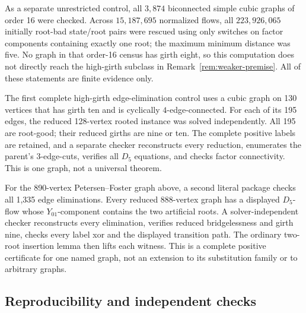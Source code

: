 \documentclass[11pt]{article}
\theoremstyle{definition}
\theoremstyle{remark}
\begin{document}
As a separate unrestricted control, all \(3{,}874\) biconnected simple
cubic graphs of order 16 were checked.  Across \(15{,}187{,}695\)
normalized flows, all \(223{,}926{,}065\) initially root-bad state/root
pairs were rescued using only switches on factor components containing
exactly one root; the maximum minimum distance was five.  No graph in
that order-16 census has girth eight, so this computation does not
directly reach the high-girth subclass in
Remark~\ref{rem:weaker-premise}.  All of these statements are finite
evidence only.

The first complete high-girth edge-elimination control uses a cubic
graph on 130 vertices that has girth ten and is cyclically
\(4\)-edge-connected.
For each of its 195 edges, the reduced 128-vertex rooted instance was
solved independently.  All 195 are root-good; their reduced girths are
nine or ten.  The complete positive labels are retained, and a separate
checker reconstructs every reduction, enumerates the parent's
3-edge-cuts, verifies all \(D_5\) equations, and checks factor
connectivity.  This is one graph, not a universal theorem.

For the 890-vertex Petersen--Foster graph above, a second literal package
checks all 1,335 edge eliminations.  Every reduced 888-vertex graph has a
displayed \(D_5\)-flow whose \(Y_{01}\)-component contains the two
artificial roots.  A solver-independent checker reconstructs every
elimination, verifies reduced bridgelessness and girth nine, checks every
label xor and the displayed transition path.  The ordinary two-root
insertion lemma then lifts each witness.  This is a complete positive certificate for one
named graph, not an extension to its substitution family or to arbitrary
graphs.

\subsection{Reproducibility and independent checks}
\end{document}
